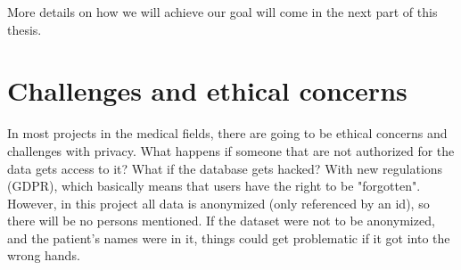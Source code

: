 More details on how we will achieve our goal will come in the next part of this thesis.

\section{Challenges and ethical concerns}
In most projects in the medical fields, there are going to be ethical concerns and challenges with privacy. What happens if someone that are not authorized for 
the data gets access to it? What if the database gets hacked? With new regulations (GDPR), which basically means that users have the right to be "forgotten". 
However, in this project all data is anonymized (only referenced by an id), so there will be no persons mentioned. If the dataset were not to be anonymized, 
and the patient's names were in it, things could get problematic if it got into the wrong hands. 



